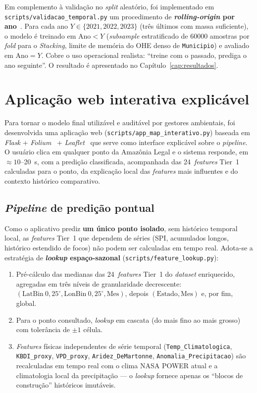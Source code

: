 Em complemento à validação no \emph{split} aleatório, foi implementado em \texttt{scripts/validacao\_temporal.py} um procedimento de \textbf{\emph{rolling-origin} por ano}~\cite{bergmeir2012cv}. Para cada ano \(Y \in \{2021, 2022, 2023\}\) (três últimos com massa suficiente), o modelo é treinado em \(\text{Ano} < Y\) (\emph{subsample} estratificado de \num{60000} amostras por \emph{fold} para o \emph{Stacking}, limite de memória do OHE denso de \texttt{Municipio}) e avaliado em \(\text{Ano} = Y\). Cobre o uso operacional realista: ``treine com o passado, prediga o ano seguinte''. O resultado é apresentado no Capítulo~\ref{cap:resultados}.

\section{Aplicação web interativa explicável}
\label{sec:metod_app_web}

Para tornar o modelo final utilizável e auditável por gestores ambientais, foi desenvolvida uma aplicação web (\texttt{scripts/app\_map\_interativo.py}) baseada em \emph{Flask} + \emph{Folium}~\cite{folium} + \emph{Leaflet}~\cite{leafletjs} que serve como interface explicável sobre o \emph{pipeline}. O usuário clica em qualquer ponto da Amazônia Legal e o sistema responde, em \(\approx 10\)--\SI{20}{\second}, com a predição classificada, acompanhada das 24~\emph{features} Tier~1 calculadas para o ponto, da explicação local das \emph{features} mais influentes e do contexto histórico comparativo.

\subsection{\emph{Pipeline} de predição pontual}

Como o aplicativo prediz \textbf{um único ponto isolado}, sem histórico temporal local, as \emph{features} Tier~1 que dependem de séries (SPI, acumulados longos, histórico estendido de focos) não podem ser calculadas em tempo real. Adota-se a estratégia de \textbf{\emph{lookup} espaço-sazonal} (\texttt{scripts/feature\_lookup.py}):

\begin{enumerate}
  \item Pré-cálculo das medianas das 24~\emph{features} Tier~1 do \emph{dataset} enriquecido, agregadas em três níveis de granularidade decrescente: \((\text{LatBin}~0{,}25^\circ, \text{LonBin}~0{,}25^\circ, \text{Mes})\), depois \((\text{Estado}, \text{Mes})\) e, por fim,  global.

  \item Para o ponto consultado, \emph{lookup} em cascata (do mais fino ao mais grosso) com tolerância de \(\pm 1\) célula.

  \item \emph{Features} físicas independentes de série temporal (\texttt{Temp\_Climatologica}, \texttt{KBDI\_proxy}, \texttt{VPD\_proxy}, \texttt{Aridez\_DeMartonne}, \texttt{Anomalia\_Precipitacao}) são recalculadas em tempo real com o clima NASA POWER atual e a climatologia local da precipitação --- o \emph{lookup} fornece apenas os ``blocos de construção'' históricos imutáveis.
\end{enumerate}

